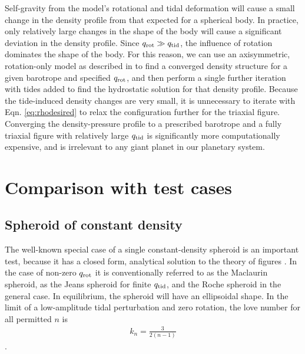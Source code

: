 Self-gravity from the model's rotational and tidal deformation will cause a small
change in the density profile from that expected for a spherical body.  In practice,
only relatively large changes in the shape of the body will cause a significant
deviation in the density profile. Since $q_{\rm rot} \gg q_{\rm tid}$, the influence
of rotation dominates the shape of the body. For this reason, we can use an
axisymmetric, rotation-only model as described in \citet{hubbard2013} to find a
converged density structure for a given barotrope and specified $q_{\rm rot}$, and
then perform a single further iteration with tides added to find the hydrostatic
solution for that density profile.  Because the tide-induced density changes are very
small, it is unnecessary to iterate with Eqn.  \eqref{eq:rhodesired} to relax the
configuration further for the triaxial figure. Converging the density-pressure
profile to a prescribed barotrope and a fully triaxial figure with relatively large
$q_{\rm tid}$ is significantly more computationally expensive, and is irrelevant to
any giant planet in our planetary system.

\section{Comparison with test cases} \label{tests}

\subsection{Spheroid of constant density} \label{maclaurin}

The well-known special case of a single constant-density spheroid is an
important test, because it has a closed form, analytical solution to the theory
of figures \citep{tassoul2015}. In the case of non-zero $q_{\rm rot}$ it is
conventionally referred to as the Maclaurin spheroid, as the Jeans spheroid for
finite $q_{\rm tid}$, and the Roche spheroid in the general case. In
equilibrium, the spheroid will have an ellipsoidal shape. In the limit of a
low-amplitude tidal perturbation and zero rotation, the love number for all
permitted $n$ is
%
\begin{equation}
\begin{aligned}
    k_n = \frac{3}{2(n-1)}
\end{aligned}
\label{eq:mac_kn}
\end{equation}
%
\citep{munk2009}. 

